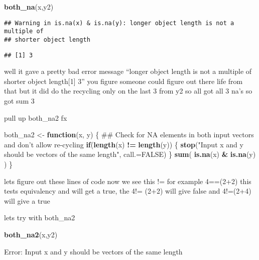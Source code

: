 \documentclass[]{article}
\newenvironment{Shaded}{\begin{snugshade}}{\end{snugshade}}
\newcommand{\KeywordTok}[1]{\textcolor[rgb]{0.13,0.29,0.53}{\textbf{#1}}}
\newcommand{\DataTypeTok}[1]{\textcolor[rgb]{0.13,0.29,0.53}{#1}}
\newcommand{\StringTok}[1]{\textcolor[rgb]{0.31,0.60,0.02}{#1}}
\newcommand{\OtherTok}[1]{\textcolor[rgb]{0.56,0.35,0.01}{#1}}
\newcommand{\ControlFlowTok}[1]{\textcolor[rgb]{0.13,0.29,0.53}{\textbf{#1}}}
\newcommand{\OperatorTok}[1]{\textcolor[rgb]{0.81,0.36,0.00}{\textbf{#1}}}
\newcommand{\NormalTok}[1]{#1}
\begin{document}
\begin{Shaded}
\begin{Highlighting}[]
\KeywordTok{both_na}\NormalTok{(x,y2)}
\end{Highlighting}
\end{Shaded}

\begin{verbatim}
## Warning in is.na(x) & is.na(y): longer object length is not a multiple of
## shorter object length
\end{verbatim}

\begin{verbatim}
## [1] 3
\end{verbatim}

well it gave a pretty bad error message ``longer object length is not a
multiple of shorter object length{[}1{]} 3'' you figure someone could
figure out there life from that but it did do the recycling only on the
last 3 from y2 so all got all 3 na's so got sum 3

pull up both\_na2 fx

\begin{Shaded}
\begin{Highlighting}[]
\NormalTok{both_na2 <-}\StringTok{ }\ControlFlowTok{function}\NormalTok{(x, y) \{}
\NormalTok{  ## Check for NA elements in both input vectors and don't allow re-cycling }
  \ControlFlowTok{if}\NormalTok{(}\KeywordTok{length}\NormalTok{(x) }\OperatorTok{!=}\StringTok{ }\KeywordTok{length}\NormalTok{(y)) \{}
    \KeywordTok{stop}\NormalTok{(}\StringTok{"Input x and y should be vectors of the same length"}\NormalTok{, }\DataTypeTok{call.=}\OtherTok{FALSE}\NormalTok{)}
\NormalTok{  \}}
  \KeywordTok{sum}\NormalTok{( }\KeywordTok{is.na}\NormalTok{(x) }\OperatorTok{&}\StringTok{ }\KeywordTok{is.na}\NormalTok{(y) )}
\NormalTok{\}}
\end{Highlighting}
\end{Shaded}

lets figure out these lines of code now we see this != for example
4==(2+2) this tests equivalency and will get a true, the 4!= (2+2) will
give false and 4!=(2+4) will give a true

lets try with both\_na2

\begin{Shaded}
\begin{Highlighting}[]
\KeywordTok{both_na2}\NormalTok{(x,y2)}
\end{Highlighting}
\end{Shaded}

Error: Input x and y should be vectors of the same length
\end{document}
